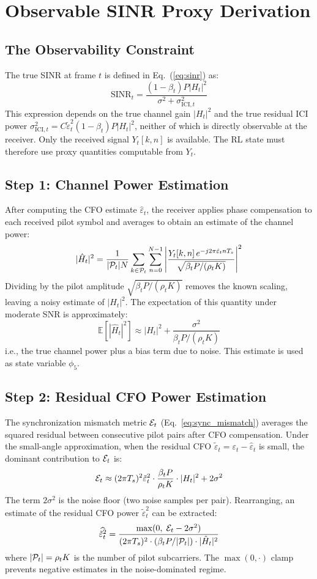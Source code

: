 \chapter{Observable SINR Proxy Derivation}
\label{app:sinr_proxy}

\section{The Observability Constraint}

The true SINR at frame $t$ is defined in Eq.~(\ref{eq:sinr}) as:
\[
    \text{SINR}_t = \frac{(1-\beta_t)P|H_t|^2}{\sigma^2 + \sigma^2_{\text{ICI},t}}
\]
This expression depends on the true channel gain $|H_t|^2$ and the true residual ICI power $\sigma^2_{\text{ICI},t} = C\tilde{\varepsilon}_t^2(1-\beta_t)P|H_t|^2$, neither of which is directly observable at the receiver. Only the received signal $Y_t[k,n]$ is available. The RL state must therefore use proxy quantities computable from $Y_t$.

\section{Step 1: Channel Power Estimation}

After computing the CFO estimate $\hat{\varepsilon}_t$, the receiver applies phase compensation to each received pilot symbol and averages to obtain an estimate of the channel power:
\[
    |\hat{H}_t|^2 = \frac{1}{|\mathcal{P}_t| N} \sum_{k \in \mathcal{P}_t} \sum_{n=0}^{N-1} \left|\frac{Y_t[k,n]\, e^{-j2\pi\hat{\varepsilon}_t n T_s}}{\sqrt{\beta_t P / (\rho_t K)}}\right|^2
\]
Dividing by the pilot amplitude $\sqrt{\beta_t P / (\rho_t K)}$ removes the known scaling, leaving a noisy estimate of $|H_t|^2$. The expectation of this quantity under moderate SNR is approximately:
\[
    \mathbb{E}\!\left[|\hat{H}_t|^2\right] \approx |H_t|^2 + \frac{\sigma^2}{\beta_t P / (\rho_t K)}
\]
i.e., the true channel power plus a bias term due to noise. This estimate is used as state variable $\phi_5$.

\section{Step 2: Residual CFO Power Estimation}

The synchronization mismatch metric $\mathcal{E}_t$ (Eq.~\ref{eq:sync_mismatch}) averages the squared residual between consecutive pilot pairs after CFO compensation. Under the small-angle approximation, when the residual CFO $\tilde{\varepsilon}_t = \varepsilon_t - \hat{\varepsilon}_t$ is small, the dominant contribution to $\mathcal{E}_t$ is:
\[
    \mathcal{E}_t \approx (2\pi T_s)^2 \tilde{\varepsilon}_t^2 \cdot \frac{\beta_t P}{\rho_t K} \cdot |H_t|^2 + 2\sigma^2
\]
The term $2\sigma^2$ is the noise floor (two noise samples per pair). Rearranging, an estimate of the residual CFO power $\tilde{\varepsilon}_t^2$ can be extracted:
\[
    \widehat{\tilde{\varepsilon}_t^2} = \frac{\max(0,\;\mathcal{E}_t - 2\sigma^2)}{(2\pi T_s)^2 \cdot (\beta_t P / |\mathcal{P}_t|) \cdot |\hat{H}_t|^2}
\]
where $|\mathcal{P}_t| = \rho_t K$ is the number of pilot subcarriers. The $\max(0, \cdot)$ clamp prevents negative estimates in the noise-dominated regime.

